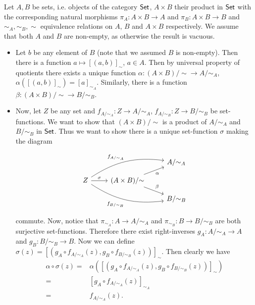 \begin{problem}
\end{problem}

\begin{solution}
	Let $A, B$ be sets, i.e. objects of the category $\mathsf{Set}$, $A \times B$ their product in $\mathsf{Set}$ with the corresponding natural morphisms $\pi_A: A \times B \to A$ and $\pi_B: A \times B \to B$ and $\sim_A, \sim_B, \sim$ equivalence relations on $A$, $B$ and $A \times B$ respectively. We assume that both $A$ and $B$ are non-empty, as otherwise the result is vacuous.
	
	\begin{itemize}
		\item Let $b$ be any element of $B$ (note that we assumed $B$ is non-empty). Then
		there is a function $a \mapsto [(a, b)]_{\sim}$, $a \in A$. Then by universal property of
		quotients there exists a unique function $\alpha: (A \times B)/{\sim} \to A/{\sim_A}$, $\alpha([(a, b)]_{\sim})=[a]_{\sim_A}$.
		Similarly, there is a function $\beta: (A \times B)/{\sim} \to B/{\sim_B}$.
		
		\item Now, let $Z$ be any set and $f_{A/{\sim_A}}: Z \to A/{\sim_A}$, $f_{A/{\sim_B}}: Z \to B/{\sim_B}$ be  set-functions. We want to show that $(A \times B)/{\sim}$ is a product of $A/{\sim_A}$ and $B/{\sim_B}$ in $\mathsf{Set}$. Thus we want to show there is a unique set-function $\sigma$ making the diagram
		
		\begin{equation*}
			\begin{tikzcd}[row sep=small]
				& & A/{\sim_A} \\
				Z
				\arrow[r, "\sigma"]
				\arrow[urr, bend left=20, "f_{A/{\sim_A}}"]
				\arrow[drr, bend right=20, "f_{B/{\sim_B}}"'] &
				(A \times B)/{\sim}
				\arrow[ur, "\alpha"']
				\arrow[dr, "\beta"] & \\
				& & B/{\sim_B}
			\end{tikzcd}
		\end{equation*}
		
		commute. Now, notice that $\pi_{\sim_A}: A \to A/{\sim_A}$ and $\pi_{\sim_B}: B \to
		B/{\sim_B}$ are both surjective set-functions. Therefore there exist right-inverses
		$g_A: A/{\sim_A} \to A$ and $g_B: B/{\sim_B} \to B$. Now we can define $\sigma(z) = [(g_A \circ f_{A/{\sim_A}}(z), g_B \circ f_{B/{\sim_B}}(z))]_{\sim}$. Then clearly we have
		\begin{equation*}
		\begin{aligned}
			\alpha \circ \sigma (z) ={} & \alpha([(g_A \circ f_{A/{\sim_A}}(z), g_B \circ f_{B/{\sim_B}}(z))]_{\sim}) \\ 
			={} & [g_A \circ f_{A/{\sim_A}}(z)]_{\sim_A} \\
			={} & f_{A/{\sim_A}}(z).
		\end{aligned}
		\end{equation*}
	

\end{itemize}
\end{solution}
